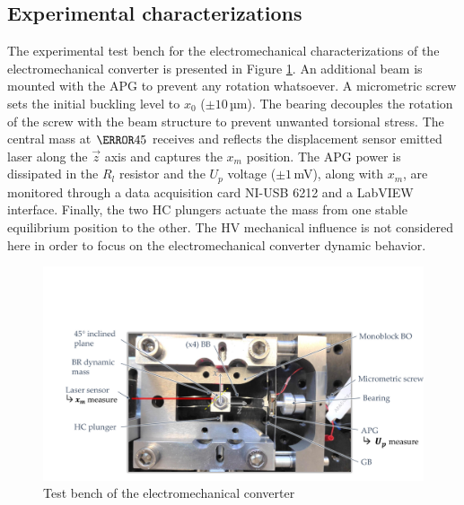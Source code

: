 \documentclass[3p,twocolumn,preprint]{elsarticle}
\begin{document}
	\subsection{Experimental characterizations}	
	\label{subsec:Experimental characterizations}
The experimental test bench for the electromechanical characterizations of the electromechanical converter is presented in Figure \ref{fig:BDT_OB+GPA}. An additional beam is mounted with the APG to prevent any rotation whatsoever. A micrometric screw sets the initial buckling level to $x_0$ ($\pm 10$\,µm). The bearing decouples the rotation of the screw with the beam structure to prevent unwanted torsional stress. The central mass at $\degree{45}$ receives and reflects the displacement sensor emitted laser along the $\vec{z}$ axis and captures the $x_m$ position. The APG power is dissipated in the $R_l$ resistor and the $U_p$ voltage ($\pm 1$\,mV), along with $x_m$, are monitored through a data acquisition card NI-USB 6212 and a LabVIEW interface. Finally, the two HC plungers actuate the mass from one stable equilibrium position to the other. The HV mechanical influence is not considered here in order to focus on the electromechanical converter dynamic behavior. 
\begin{figure}[!htbp]
	\centering
	\captionsetup{justification=centering}
	\includegraphics[trim={2cm 0cm 0cm 5.5cm},clip,width=\linewidth]{figures/BDT_OB+GPA.pdf}
	\caption{Test bench of the electromechanical converter}
	\label{fig:BDT_OB+GPA}
\end{figure}
\end{document}
